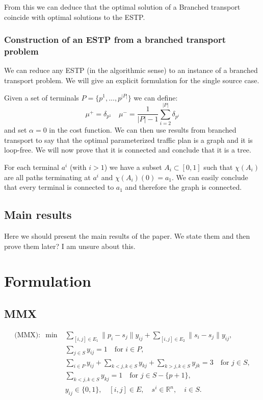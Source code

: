\documentclass{article}
\begin{document}
    From this we can deduce that the optimal solution of a Branched transport coincide with optimal solutions to the ESTP.

    \subsubsection{Construction of an ESTP from a branched transport problem}

    We can reduce any ESTP (in the algorithmic sense) to an instance of a branched transport problem. We will give an
    explicit formulation for the single source case.

    Given a set of terminals $P = \{p^1, ..., p^{|P|}\}$ we can define:
    \begin{equation}
        \mu^+ = \delta_{p^1} \quad \mu^- = \frac{1}{|P| - 1}\sum_{i = 2}^{|P|} \delta_{p^i}
    \end{equation}
    and set $\alpha =0$ in the cost function.
    We can then use results from branched transport to say that the optimal parameterized
    traffic plan is a graph and it is loop-free. We will now prove that it is connected and conclude that it is a tree.

    For each terminal $a^i$ (with $i>1$) we have a subset $A_i \subset [0,1]$ such that $\chi(A_i)$ are all paths terminating at $a^i$ and
    $\chi(A_i)(0) = a_1$.
    We can easily conclude that every terminal is connected to $a_1$ and therefore the graph is connected.

    \subsection{Main results}

    Here we should present the main results of the paper. We state them and then prove them later? I am unsure about this.



    \section{Formulation}

    \subsection{MMX}

    \begin{align}
        \text{(MMX)}: \; \min &\sum_{[i,j] \in E_1} \|p_i - s_j\| y_{ij} + \sum_{[i,j] \in E_2} \|s_i - s_j\| y_{ij}, \\
        & \sum_{j \in S} y_{ij} = 1 \quad \text{for } i \in P, \\
        & \sum_{i \in P} y_{ij} + \sum_{k < j, k \in S} y_{kj} + \sum_{k > j, k \in S} y_{jk} = 3 \quad \text{for } j \in S, \label{MMX:connectivity_steiner} \\
        & \sum_{k < j, k \in S} y_{kj} = 1 \quad \text{for } j \in S - \{p+1\},  \\
        & y_{ij} \in \{0, 1\}, \quad [i, j] \in E, \quad s^i \in \mathbb{R}^n, \quad i \in S.
    \end{align}
\end{document}
